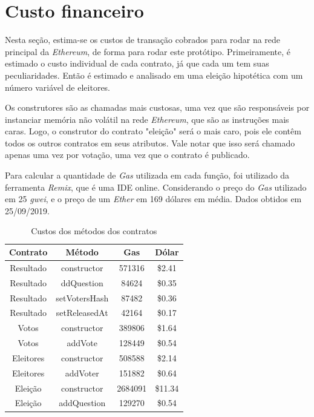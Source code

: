 \documentclass{ufsctex/ufsctex}
\begin{document}
\section{Custo financeiro}

Nesta seção, estima-se os custos de transação cobrados para rodar na rede
principal da \textit{Ethereum}, de forma para rodar este protótipo.
Primeiramente, é estimado o custo individual de cada contrato, já que cada um
tem suas peculiaridades. Então é estimado e analisado em uma eleição hipotética
com um número variável de eleitores.

Os construtores são as chamadas mais custosas, uma vez que são responsáveis por
instanciar memória não volátil na rede \textit{Ethereum}, que são as instruções
mais caras. Logo, o construtor do contrato "eleição" será o mais caro, pois ele
contêm todos os outros contratos em seus atributos. Vale notar que isso será
chamado apenas uma vez por votação, uma vez que o contrato é publicado.

Para calcular a quantidade de \textit{Gas} utilizada em cada função, foi
utilizado da ferramenta \textit{Remix}, que é uma IDE online. Considerando o
preço do \textit{Gas} utilizado em 25 \textit{gwei}, e o preço de um
\textit{Ether} em 169 dólares em média. Dados obtidos em 25/09/2019.

\begin{table}[htb]
\centering
\begin{tabular}{||c|c|c|c||}
\hline
\textbf{Contrato}   & \textbf{Método}        & \textbf{Gas}    & \textbf{Dólar}  \\  [0.2ex] \hline \hline
Resultado & constructor   & 571316 & \$2.41 \\
Resultado & ddQuestion   & 84624  & \$0.35 \\ 
Resultado & setVotersHash & 87482  & \$0.36 \\ 
Resultado & setReleasedAt & 42164  & \$0.17 \\
\hline
Votos &		constructor & 389806 & \$1.64 \\ 
Votos & addVote     & 128449 & \$0.54 \\
\hline
Eleitores	&	constructor & 508588 & \$2.14 \\ 
Eleitores & addVoter    & 151882 & \$0.64 \\ 
\hline
Eleição & 		constructor & 2684091 & \$11.34 \\ 
Eleição & addQuestion & 129270  & \$0.54  \\
	\hline
\end{tabular}
\caption{Custos dos métodos dos contratos}
\label{tab:my-table}
\end{table}
\end{document}
